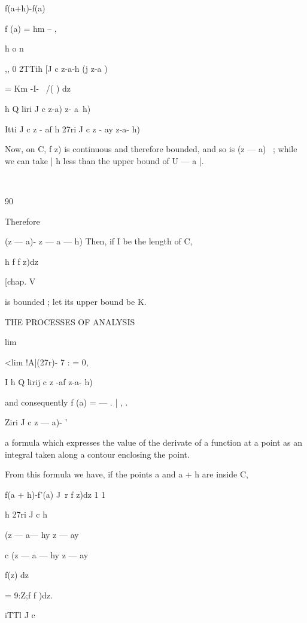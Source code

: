 {{f(a+h)-f(a) 

f (a) = hm --  , 

h o n 

,, 0 2TTih [J c z-a-h   (j z-a ) 

= Km -I- \ /( ) dz 

h Q liri J c z-a) z- a~h) 

Itti J c  z - af h  27ri J c  z - ay  z-a- h) 

Now, on C, f z) is continuous and therefore bounded, and so is (z — a)~  ; 
while we can take | h less than the upper bound of   U — a |. 



\ 



90 



Therefore 



(z — a)- z — a — h) 
Then, if I be the length of C, 

h f f z)dz 



[chap. V 

is bounded ; let its upper bound be K. 



THE PROCESSES OF ANALYSIS 



lim 



<lim !A|(27r)-  7 :  = 0, 



I h Q lirij c  z -af z-a- h) 

and consequently f (a) =   — . | ,   . 

   Ziri J c  z — a)- ' 

a formula which expresses the value of the derivate of a function at a point 
as an integral taken along a contour enclosing the point. 

From this formula we have, if the points a and a + h are inside C, 

f(a + h)-f'(a)   J\  r f z)dz   1 1 

h 27ri J c h 



(z — a— hy  z — ay 

c (z — a — hy  z — ay 

f(z) dz 



= 9:Z;f f  )dz. 

iTTl J c 



}}
